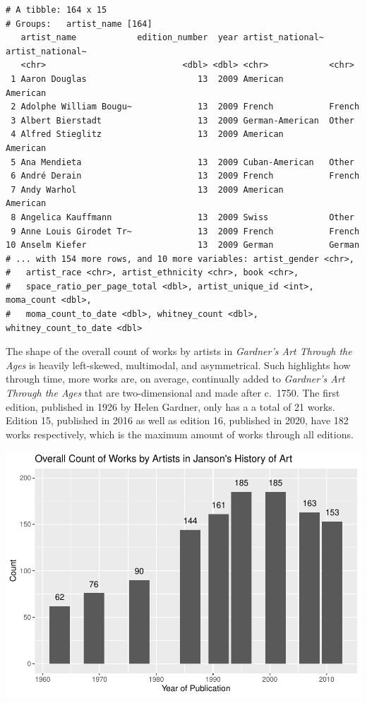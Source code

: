 \documentclass[
  letterpaper,
  DIV=11,
  numbers=noendperiod]{scrreprt}
\begin{document}
\begin{verbatim}
# A tibble: 164 x 15
# Groups:   artist_name [164]
   artist_name            edition_number  year artist_national~ artist_national~
   <chr>                           <dbl> <dbl> <chr>            <chr>           
 1 Aaron Douglas                      13  2009 American         American        
 2 Adolphe William Bougu~             13  2009 French           French          
 3 Albert Bierstadt                   13  2009 German-American  Other           
 4 Alfred Stieglitz                   13  2009 American         American        
 5 Ana Mendieta                       13  2009 Cuban-American   Other           
 6 André Derain                       13  2009 French           French          
 7 Andy Warhol                        13  2009 American         American        
 8 Angelica Kauffmann                 13  2009 Swiss            Other           
 9 Anne Louis Girodet Tr~             13  2009 French           French          
10 Anselm Kiefer                      13  2009 German           German          
# ... with 154 more rows, and 10 more variables: artist_gender <chr>,
#   artist_race <chr>, artist_ethnicity <chr>, book <chr>,
#   space_ratio_per_page_total <dbl>, artist_unique_id <int>, moma_count <dbl>,
#   moma_count_to_date <dbl>, whitney_count <dbl>, whitney_count_to_date <dbl>
\end{verbatim}

The shape of the overall count of works by artists in \emph{Gardner's
Art Through the Ages} is heavily left-skewed, multimodal, and
asymmetrical. Such highlights how through time, more works are, on
average, continually added to \emph{Gardner's Art Through the Ages} that
are two-dimensional and made after c.~1750. The first edition, published
in 1926 by Helen Gardner, only has a a total of 21 works. Edition 15,
published in 2016 as well as edition 16, published in 2020, have 182
works respectively, which is the maximum amount of works through all
editions.

\includegraphics{Chapter1/Chapter1_files/figure-pdf/jansoncountthroughtime-1.pdf}
\end{document}
